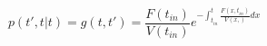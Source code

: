 \begin{equation}
p(t',t|t)=g(t,t')= \frac{F(t_{in})}{V(t_{in})} e^{-\int_{t_{in}}^t \frac{F(x,t_{in})}{V(x,)} dx}
\end{equation}
